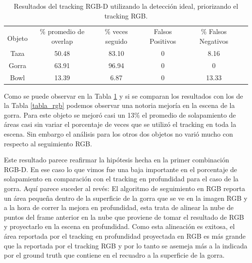 \begin{table}[h]
    \begin{tabular}{|c|c|c|c|c|c|}
    \hline
    & \multirow{2}{2.4cm}{\% promedio de overlap} & \multirow{2}{2cm}{\% veces seguido} & \multirow{2}{1.6cm}{Falsos Positivos} & \multirow{2}{1.6cm}{\% Falsos Negativos}\\
	Objeto & & & &\\
    \hline
    Taza   & 50.48      & 83.10     & 0      & 8.16  \\
    \hline
    Gorra  & 63.91      & 96.94     & 0      & 0     \\
    \hline
    Bowl   & 13.39      &  6.87     & 0      & 13.33 \\
    \hline
    \end{tabular}
\caption{Resultados del tracking RGB-D utilizando la detección ideal, priorizando el tracking RGB.}
\label{tabla_rgbd_rgb}
\end{table}


Como se puede observar en la Tabla \ref{tabla_rgbd_rgb} y si se comparan los resultados con los de la Tabla \ref{tabla_rgb} podemos observar una notoria mejoría en la escena de la gorra. Para este objeto se mejoró casi un 13\% el promedio de solapamiento de áreas casi sin variar el porcentaje de veces que se utilizó el tracking en toda la escena. Sin embargo el análisis para los otros dos objetos no varió mucho con respecto al seguimiento RGB.


Este resultado parece reafirmar la hipótesis hecha en la primer combinación RGB-D. En ese caso lo que vimos fue una baja importante en el porcentaje de solapamiento en comparación con el tracking en profundidad para el caso de la gorra. Aquí parece suceder al revés: El algoritmo de seguimiento en RGB reporta un área pequeña dentro de la superficie de la gorra que se ve en la imagen RGB y a la hora de correr la mejora en profundidad, esta trata de alinear la nube de puntos del frame anterior en la nube que proviene de tomar el resultado de RGB y proyectarlo en la escena en profundidad. Como esta alineación es exitosa, el área reportada por el tracking en profundidad proyectada en RGB es más grande que la reportada por el tracking RGB y por lo tanto se asemeja más a la indicada por el ground truth que contiene en el recuadro a la superficie de la gorra.




